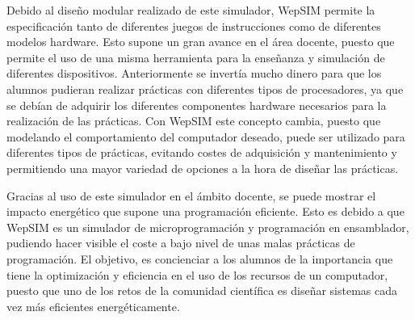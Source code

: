 Debido al diseño modular realizado de este simulador, WepSIM permite la especificación tanto de diferentes juegos de instrucciones como de diferentes modelos hardware. Esto supone un gran avance  en el área docente, puesto que permite el uso de una misma herramienta para la enseñanza y simulación de diferentes dispositivos. Anteriormente se invertía mucho dinero para que los alumnos pudieran realizar prácticas con diferentes tipos de procesadores, ya que se debían de adquirir los diferentes componentes hardware necesarios para la realización de las prácticas. Con WepSIM este concepto cambia, puesto que modelando el comportamiento del computador deseado, puede ser utilizado para diferentes tipos de prácticas, evitando costes de adquisición y mantenimiento y permitiendo una mayor variedad de opciones a la hora de diseñar las prácticas.

Gracias al uso de este simulador en el ámbito docente, se puede mostrar el impacto energético que supone una programación eficiente. Esto es debido a que WepSIM es un simulador de microprogramación y programación en ensamblador, pudiendo hacer visible el coste a bajo nivel de unas malas prácticas de programación. El objetivo, es concienciar a los alumnos de la importancia que tiene la optimización y eficiencia en el uso de los recursos de un computador, puesto que uno de los retos de la comunidad científica es diseñar sistemas cada vez más eficientes energéticamente.
